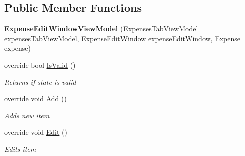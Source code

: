 \subsection*{Public Member Functions}
\begin{DoxyCompactItemize}
\item 
\hypertarget{class_baudi_1_1_client_1_1_view_models_1_1_edit_window_view_models_1_1_expense_edit_window_view_model_a4b6c2cd150d95a0ebce6e6d0f8c65564}{}{\bfseries Expense\+Edit\+Window\+View\+Model} (\hyperlink{class_baudi_1_1_client_1_1_view_models_1_1_tabs_view_models_1_1_expenses_tab_view_model}{Expenses\+Tab\+View\+Model} expenses\+Tab\+View\+Model, \hyperlink{class_baudi_1_1_client_1_1_view_1_1_edit_windows_1_1_expense_edit_window}{Expense\+Edit\+Window} expense\+Edit\+Window, \hyperlink{class_baudi_1_1_d_a_l_1_1_models_1_1_expense}{Expense} expense)\label{class_baudi_1_1_client_1_1_view_models_1_1_edit_window_view_models_1_1_expense_edit_window_view_model_a4b6c2cd150d95a0ebce6e6d0f8c65564}

\item 
override bool \hyperlink{class_baudi_1_1_client_1_1_view_models_1_1_edit_window_view_models_1_1_expense_edit_window_view_model_a5253620600d337805963c5a0e48fa597}{Is\+Valid} ()
\begin{DoxyCompactList}\small\item\em Returns if state is valid \end{DoxyCompactList}\item 
override void \hyperlink{class_baudi_1_1_client_1_1_view_models_1_1_edit_window_view_models_1_1_expense_edit_window_view_model_ab86accfb144c9c369daded36ee7cbe14}{Add} ()
\begin{DoxyCompactList}\small\item\em Adds new item \end{DoxyCompactList}\item 
override void \hyperlink{class_baudi_1_1_client_1_1_view_models_1_1_edit_window_view_models_1_1_expense_edit_window_view_model_ac0a047fbff4a391af6c2c56ba47e86fb}{Edit} ()
\begin{DoxyCompactList}\small\item\em Edits item \end{DoxyCompactList}\end{DoxyCompactItemize}
